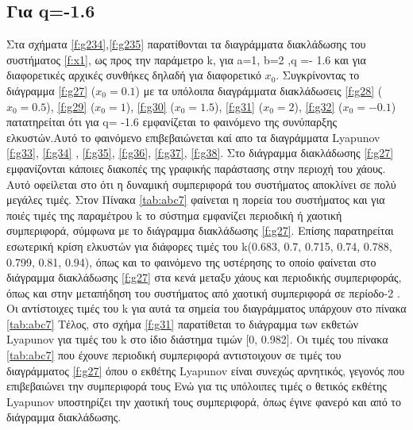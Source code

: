 \clearpage
\subsection{Για q=-1.6}
Στα σχήματα \ref{f:g234},\ref{f:g235}  παρατίθονται τα διαγράμματα διακλάδωσης του συστήματος \ref{f:x1}, ως προς την παράμετρο k, για a=1, b=2 ,q =- 1.6 και για διαφορετικές αρχικές συνθήκες δηλαδή για διαφορετικό \(x_0\). Συγκρίνοντας το διάγραμμα \ref{f:g27} (\(x_0=0.1\)) με τα υπόλοιπα διαγράμματα διακλάδωσεις \ref{f:g28} (\(x_0=0.5\)), \ref{f:g29} (\(x_0=1\)), \ref{f:g30} (\(x_0=1.5\)), \ref{f:g31} (\(x_0=2\)), \ref{f:g32} (\(x_0=-0.1\)) πατατηρείται ότι για q= -1.6 εμφανίζεται το φαινόμενο της συνύπαρξης ελκυστών.Αυτό το φαινόμενο επιβεβαιώνεται καί απο τα διαγράμματα Lyapunov \ref{f:g33}, \ref{f:g34} , \ref{f:g35},  \ref{f:g36},  \ref{f:g37},  \ref{f:g38}.
Στο διάγραμμα διακλάδωσης \ref{f:g27} εμφανίζονται κάποιες διακοπές της γραφικής παράστασης στην περιοχή του χάους. Αυτό οφείλεται στο ότι η δυναμική συμπεριφορά του συστήματος αποκλίνει σε πολύ μεγάλες τιμές.
Στον Πίνακα \ref{tab:abc7} φαίνεται η πορεία του συστήματος και για ποιές τιμές της παραμέτρου  k το σύστημα εμφανίζει περιοδική ή χαοτική συμπεριφορά, σύμφωνα με το διάγραμμα διακλάδωσης \ref{f:g27}.
Επίσης παρατηρείται εσωτερική κρίση ελκυστών για διάφορες τιμές του k(0.683, 0.7, 0.715, 0.74, 0.788, 0.799, 0.81, 0.94), όπως και το φαινόμενο της υστέρησης το οποίο φαίνεται στο διάγραμμα διακλάδωσης \ref{f:g27} στα κενά μεταξυ χάους και περιοδικής συμπεριφοράς, όπως και στην μεταπήδηση του συστήματος από χαοτική συμπεριφορά σε περίοδο-2 . Οι αντίστοιχες τιμές του k για αυτά τα σημεία του διαγράμματος υπάρχουν στο πίνακα \ref{tab:abc7}
Τέλος, στο σχήμα \ref{f:g31} παρατίθεται το διάγραμμα των εκθετών Lyapunov για τιμές του k στο ίδιο διάστημα τιμών [0, 0.982]. Οι τιμές του πίνακα \ref{tab:abc7} που έχουνε περιοδική συμπεριφορά αντιστοιχουν σε τιμές του διαγράμματος \ref{f:g27} όπου ο εκθέτης Lyapunov είναι συνεχώς αρνητικός, γεγονός που επιβεβαιώνει την συμπεριφορά τους Ενώ για τις υπόλοιπες τιμές ο θετικός εκθέτης Lyapunov υποστηρίζει την χαοτική τους συμπεριφορά, όπως έγινε φανερό και από το διάγραμμα διακλάδωσης.


